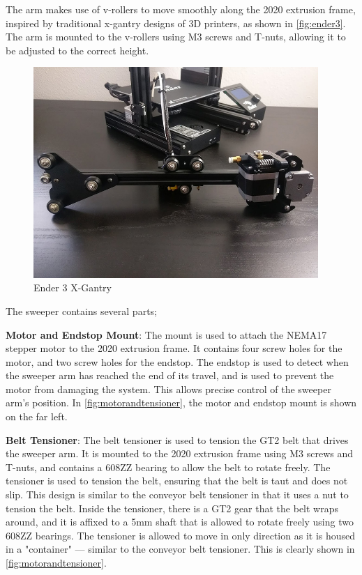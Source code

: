 The arm makes use of v-rollers to move smoothly along the 2020 extrusion frame, inspired by traditional x-gantry designs of 3D printers, as shown in \autoref{fig:ender3}. The arm is mounted to the v-rollers using M3 screws and T-nuts, allowing it to be adjusted to the correct height.

\begin{figure}[H]
    \begin{minipage}[h]{0.95\textwidth}
        \centering
        \includegraphics[height=8cm]{imgs/freecad/ender_3_assembly_x_axis_complete.jpg}
        \caption{Ender 3 X-Gantry \cite{brett_2018}}
        \label{fig:ender3}
    \end{minipage}
\end{figure}

The sweeper contains several parts;

\textbf{Motor and Endstop Mount}: The mount is used to attach the NEMA17 stepper motor to the 2020 extrusion frame. It contains four screw holes for the motor, and two screw holes for the endstop. The endstop is used to detect when the sweeper arm has reached the end of its travel, and is used to prevent the motor from damaging the system. This allows precise control of the sweeper arm's position. In \autoref{fig:motorandtensioner}, the motor and endstop mount is shown on the far left.
\par
\textbf{Belt Tensioner}: The belt tensioner is used to tension the GT2 belt that drives the sweeper arm. It is mounted to the 2020 extrusion frame using M3 screws and T-nuts, and contains a 608ZZ bearing to allow the belt to rotate freely. The tensioner is used to tension the belt, ensuring that the belt is taut and does not slip. This design is similar to the conveyor belt tensioner in that it uses a nut to tension the belt. Inside the tensioner, there is a GT2 gear that the belt wraps around, and it is affixed to a 5mm shaft that is allowed to rotate freely using two 608ZZ bearings. The tensioner is allowed to move in only direction as it is housed in a "container" --- similar to the conveyor belt tensioner. This is clearly shown in \autoref{fig:motorandtensioner}.

